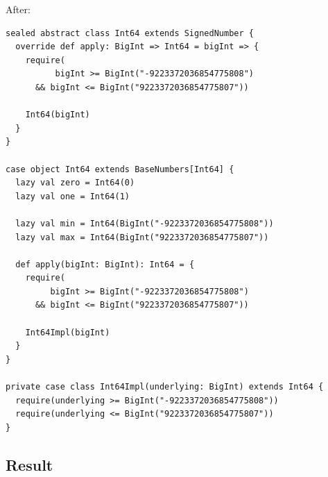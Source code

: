 \documentclass[runningheads]{llncs}
\begin{document}
After:
\begin{lstlisting}[style=scala]
sealed abstract class Int64 extends SignedNumber {
  override def apply: BigInt => Int64 = bigInt => {
    require(
          bigInt >= BigInt("-9223372036854775808")
      && bigInt <= BigInt("9223372036854775807"))

    Int64(bigInt)
  }
}
  
case object Int64 extends BaseNumbers[Int64] {
  lazy val zero = Int64(0)
  lazy val one = Int64(1)

  lazy val min = Int64(BigInt("-9223372036854775808"))
  lazy val max = Int64(BigInt("9223372036854775807"))

  def apply(bigInt: BigInt): Int64 = {
    require(
         bigInt >= BigInt("-9223372036854775808")
      && bigInt <= BigInt("9223372036854775807"))

    Int64Impl(bigInt)
  }
}

private case class Int64Impl(underlying: BigInt) extends Int64 {
  require(underlying >= BigInt("-9223372036854775808"))
  require(underlying <= BigInt("9223372036854775807"))
}
\end{lstlisting}


\subsection{Result}
\end{document}
